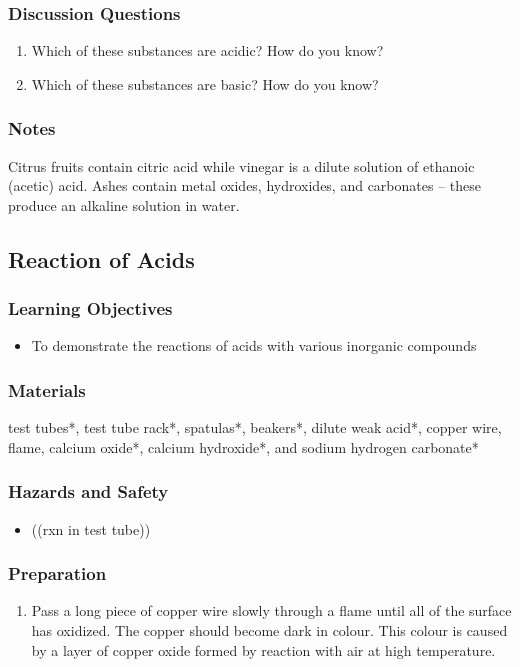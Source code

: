 \subsubsection*{Discussion Questions}
\begin{enumerate}
\item{Which of these substances are acidic? How do you know?}
\item{Which of these substances are basic? How do you know?}
\end{enumerate}

\subsubsection*{Notes}
Citrus fruits contain citric acid while vinegar is a dilute solution of ethanoic (acetic) acid. Ashes contain metal oxides, hydroxides, and carbonates -- these produce an alkaline solution in water.

\subsection{Reaction of Acids}

\subsubsection*{Learning Objectives}
\begin{itemize}
\item{To demonstrate the reactions of acids with various inorganic compounds}
\end{itemize}

\subsubsection*{Materials}
test tubes*, test tube rack*, spatulas*, beakers*, dilute weak acid*, copper wire, flame, calcium oxide*, calcium hydroxide*, and sodium hydrogen carbonate*

\subsubsection*{Hazards and Safety}
\begin{itemize}
\item{((rxn in test tube))}
\end{itemize}

\subsubsection*{Preparation}
\begin{enumerate}
\item{Pass a long piece of copper wire slowly through a flame until all of the surface has oxidized. The copper should become dark in colour. This colour is caused by a layer of copper oxide formed by reaction with air at high temperature.}
\end{enumerate}

